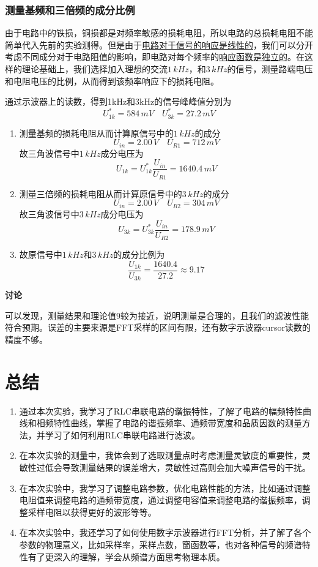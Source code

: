 \documentclass[12pt]{article}
\begin{document}
\subsubsection{测量基频和三倍频的成分比例}
\quad 由于电路中的铁损，铜损都是对频率敏感的损耗电阻，所以电路的总损耗电阻不能简单代入先前的实验测得。但是由于\underline{电路对于信号的响应是线性的}，我们可以分开考虑不同成分对于电路阻值的影响，即电路对每个频率的\underline{响应函数是独立的}。在这样的理论基础上，我们选择加入理想的交流$1\,kHz$，和$3\,kHz$的信号，测量路端电压和电阻电压的比例，从而得到该频率响应下的损耗电阻。
\par
通过示波器上的读数，得到1kHz和3kHz的信号峰峰值分别为
\[
    U^{*}_{1k}=584\,mV\quad U^{*}_{3k}=27.2\,mV
\]
\begin{enumerate}
    \item 测量基频的损耗电阻从而计算原信号中的$1\,kHz$的成分
    \[
        U_{in}=2.00\,V\quad U_{R1}=712\,mV
    \]
    故三角波信号中$1\,kHz$成分电压为
    \[
        U_{1k}=U^{*}_{1k}\frac{U_{in}}{U_{R1}}=1640.4\,mV
    \]
    \item 测量三倍频的损耗电阻从而计算原信号中的$3\,kHz$的成分
    \[
        U_{in}=2.00\,V\quad U_{R2}=304\,mV
    \]
    故三角波信号中$3\,kHz$成分电压为
    \[
        U_{3k}=U^{*}_{3k}\frac{U_{in}}{U_{R2}}=178.9\,mV
    \]
   \item 故原信号中$1\,kHz$和$3\,kHz$的成分比例为
    \begin{equation}
        \frac{U_{1k}}{U_{3k}}=\frac{1640.4}{27.2}\approx 9.17
    \end{equation}
\end{enumerate}
\textbf{讨论}
\par
可以发现，测量结果和理论值$9$较为接近，说明测量是合理的，且我们的滤波性能符合预期。误差的主要来源是FFT采样的区间有限，还有数字示波器cursor读数的精度不够。
\section{总结}
\begin{enumerate}
\item 通过本次实验，我学习了RLC串联电路的谐振特性，了解了电路的幅频特性曲线和相频特性曲线，掌握了电路的谐振频率、通频带宽度和品质因数的测量方法，并学习了如何利用RLC串联电路进行滤波。
\item 在本次实验的测量中，我体会到了选取测量点时考虑测量灵敏度的重要性，灵敏性过低会导致测量结果的误差增大，灵敏性过高则会加大噪声信号的干扰。
\item 在本次实验中，我学习了调整电路参数，优化电路性能的方法，比如通过调整电阻值来调整电路的通频带宽度，通过调整电容值来调整电路的谐振频率，调整采样电阻以获得更好的波形等等。
\item 在本次实验中，我还学习了如何使用数字示波器进行FFT分析，并了解了各个参数的物理意义，比如采样率，采样点数，窗函数等，也对各种信号的频谱特性有了更深入的理解，学会从频谱方面思考物理本质。
\end{enumerate}
\end{document}

